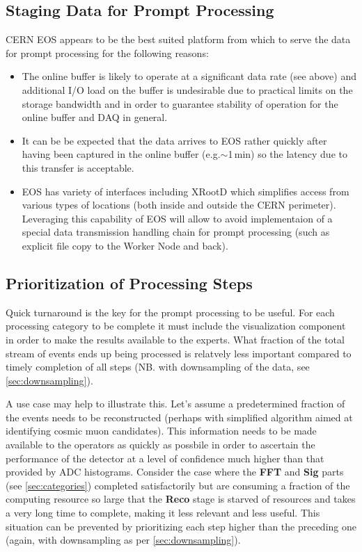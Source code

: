 \documentclass[pdftex,12pt,letter]{article}
\newcommand{\xrd}{XRootD\xspace}
\begin{document}
\subsection{Staging Data for Prompt Processing}
CERN EOS appears to be the best suited platform from which to
serve the data for prompt processing for the following reasons:
\begin{itemize}

\item The online buffer is likely to operate at a significant data rate (see above) and additional I/O load on the buffer is undesirable
due to practical limits on the storage bandwidth and in order to guarantee stability of operation for the online buffer and DAQ in general.

\item It can be be expected that the data arrives to EOS rather quickly after having been captured in the online buffer (e.g.$\sim$1\,min) so
the latency due to this transfer is acceptable.

\item EOS has variety of interfaces including \xrd which simplifies access from various types of locations (both inside and outside the CERN perimeter).
Leveraging this capability of EOS will allow to avoid implementaion of a special data transmission handling chain for prompt processing (such as explicit
file copy to the Worker Node and back).


\end{itemize}

\subsection{Prioritization of Processing Steps}
Quick turnaround is the key for the prompt processing to be useful. For each processing category
to be complete it must include the visualization component in order to make the results available
to the experts. What fraction of the total stream of events ends up being processed is relatvely less
important compared to timely completion of all steps (NB. with downsampling of the data, see 
\ref{sec:downsampling}).

A use case may help to illustrate this. Let's assume a predetermined fraction of the events needs to
be reconstructed (perhaps with simplified algorithm aimed at identifying cosmic muon candidates).
This information needs to be made available to the operators as quickly as possbile in order to ascertain the performance
of the detector at a level of confidence much higher than that provided by ADC histograms.
Consider the case where the \textbf{FFT} and \textbf{Sig} parts (see \ref{sec:categories})
completed satisfactorily but are consuming a fraction of the computing resource so large that
the  \textbf{Reco} stage is starved of resources and takes a very long time to complete, making
it less relevant and less useful. This situation can be prevented by prioritizing each step higher
than the preceding one (again, with downsampling as per \ref{sec:downsampling}).
\end{document}
